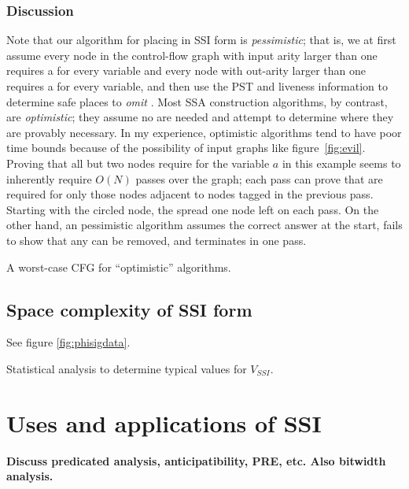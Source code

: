 \documentclass[12pt,titlepage,twoside]{article}
\newcommand*{\figscale}{1.0}
\let\oldsection\section
\renewcommand{\section}{\setcounter{figure}{0}\oldsection}
\begin{document}
\subsubsection{Discussion}
Note that our algorithm for placing  in
SSI form is
\emph{pessimistic}; that is, we at first assume every node in the
control-flow graph with input arity larger than one requires a
\phifunction{} for every variable and every node with out-arity larger
than one requires a \sigfunction{} for every variable, and then use
the PST and liveness information to determine safe places to
\emph{omit} .  Most SSA construction
algorithms, by contrast, are \emph{optimistic}; they assume no
 are needed and attempt to determine where
they are provably necessary.  In my experience, optimistic algorithms tend to
have poor time bounds because of the possibility of input graphs like
figure~\vref{fig:evil}.  Proving that all but two nodes require
 for the variable $a$ in this example seems to
inherently require $O(N)$ passes over the graph; each pass can prove
that  are required for only those nodes adjacent to
nodes tagged in the previous pass.  Starting with the circled node, the
 spread one node left on each pass. On the other hand,
an pessimistic algorithm assumes the correct answer at the start, fails
to show that any  can be removed, and
terminates in one pass.

\begin{myfigure}[t]
\centering\renewcommand*{\figscale}{0.25}
\caption{A worst-case CFG for ``optimistic'' algorithms.}
\label{fig:evil}
\end{myfigure}

\subsection{Space complexity of SSI form}
See figure \vref{fig:phisigdata}.%

\begin{myfigure}[t]

\caption{Statistical analysis to determine typical values for $V_{SSI}$.}
\label{fig:phisigdata}
\end{myfigure}

\section{Uses and applications of SSI}
\textbf{Discuss predicated analysis, anticipatibility, PRE, etc.
	Also bitwidth analysis.}%
\end{document}
